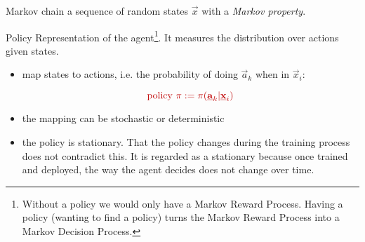 \begin{frame}


\begin{block}{Markov chain}
a sequence of random states $\vec x$ with a \emph{Markov property}.
\end{block}


\end{frame}

\begin{frame}

\begin{block}{\textcolor{policy}{Policy}}
Representation of the agent\footnote{
Without a policy we would only have a Markov Reward Process.
Having a policy (wanting to find a policy) turns the Markov Reward Process into a Markov Decision Process.
}. It measures the distribution over actions given states.
\begin{itemize}
\item map states to actions, i.e. the probability of doing $\vec a_k$ when in $\vec x_i$:

\begin{equation}
\color{policy}
\text{policy }\pi := \pi(\vec a_k | \vec x_i)
\end{equation}
\item the mapping can be stochastic or deterministic
\item the policy is stationary. That the policy changes during the training process does not contradict this.
It is regarded as a stationary because once trained and deployed, the way the agent decides does not change over time.
\end{itemize}

\end{block}

\end{frame}
